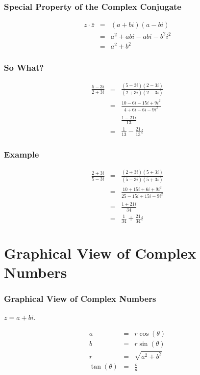 \begin{frame}
  \frametitle{Special Property of the Complex Conjugate}

  \begin{eqnarray*}
    z\cdot\bar{z} & = & (a+bi)(a-bi) \\
    & = & a^2 +abi - abi - b^2 i^2 \\
    & = & a^2 + b^2
  \end{eqnarray*}

\end{frame}



\begin{frame}
  \frametitle{So What?}

  \begin{eqnarray*}
    \frac{5-3i}{2+3i} & = & \frac{(5-3i)(2-3i)}{(2+3i)(2-3i)} \\
    & = & \frac{10-6i-15i+9i^2}{4+6i-6i-9i^2} \\
    & = & \frac{1-21i}{13} \\
    & = & \frac{1}{13} - \frac{21}{13} i
  \end{eqnarray*}

\end{frame}

\begin{frame}
  \frametitle{Example}

  \begin{eqnarray*}
    \frac{2+3i}{5-3i} & = & \frac{(2+3i)(5+3i)}{(5-3i)(5+3i)} \\
    & = & \frac{10+15i+6i+9i^2}{25-15i+15i-9i^2} \\
    & = & \frac{1+21i}{34} \\
    & = & \frac{1}{34} + \frac{21}{34}i
  \end{eqnarray*}

\end{frame}

\section{Graphical View of Complex Numbers}

\begin{frame}
  \frametitle{Graphical View of Complex Numbers}
 
  $z=a+bi$.

  
  \begin{eqnarray*}
    a & = & r\cos(\theta) \\
    b & = & r\sin(\theta) \\
    r & = & \sqrt{a^2+b^2} \\
    \tan(\theta) & = & \frac{b}{a}
  \end{eqnarray*}

\end{frame}


